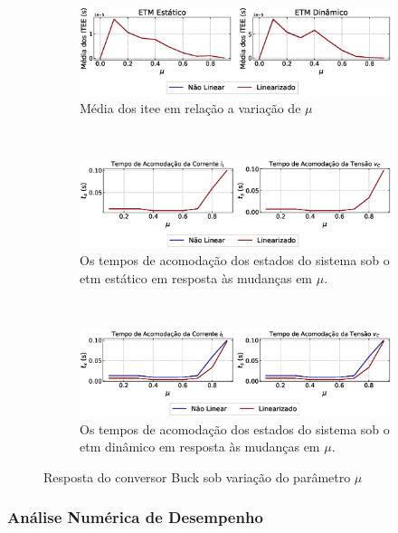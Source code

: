 \begin{figure}[H]
  \centering
  \captionsetup{justification=centering}
  \begin{subfigure}{1.\textwidth}
    \centering
    \includegraphics[width=1.\textwidth]{figuras/itee-mean.eps}
    \caption{Média dos \acrshort{itee} em relação a variação de $\mu$}
  \end{subfigure}
  \\[6pt]
  \begin{subfigure}{1.\textwidth}
    \centering
    \includegraphics[width=1.\textwidth]{figuras/static_ts.eps}
    \caption{Os tempos de acomodação dos estados do sistema sob o \acrshort{etm} estático em resposta às mudanças em $\mu$.}
  \end{subfigure}
  \\[6pt]
  \begin{subfigure}{1.\textwidth}
    \centering
    \includegraphics[width=1.\textwidth]{figuras/dynamic_ts.eps}
    \caption{Os tempos de acomodação dos estados do sistema sob o \acrshort{etm} dinâmico em resposta às mudanças em $\mu$.}
  \end{subfigure}
  \caption{Resposta do conversor Buck sob variação do parâmetro $\mu$}
  \label{fig:buck_converter_mu}
\end{figure}

\subsubsection{Análise Numérica de Desempenho}

